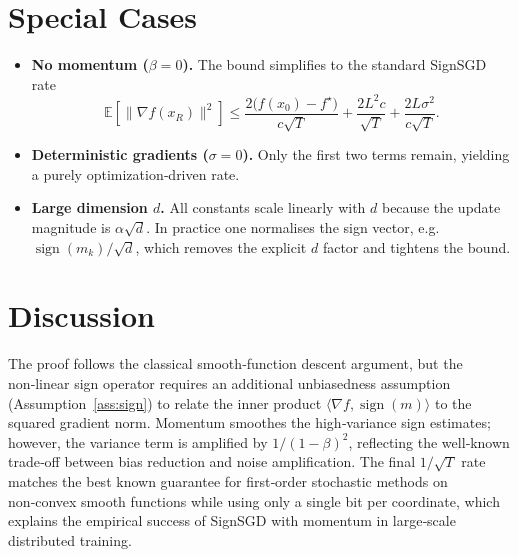 \documentclass{article}
\newcommand{\E}{\mathbb{E}}
\newcommand{\sgn}{\operatorname{sign}}
\begin{document}
\section*{Special Cases}
\begin{itemize}
\item \textbf{No momentum ($\beta=0$).}
The bound simplifies to the standard SignSGD rate
\[
\E[\|\nabla f(x_{R})\|^{2}]
\le
\frac{2\bigl(f(x_{0})-f^{\star}\bigr)}{c\sqrt{T}}
   +\frac{2L^{2}c}{\sqrt{T}}
   +\frac{2L\sigma^{2}}{c\sqrt{T}} .
\]
\item \textbf{Deterministic gradients ($\sigma=0$).}
Only the first two terms remain, yielding a purely
optimization‑driven rate.
\item \textbf{Large dimension $d$.}
All constants scale linearly with $d$ because the update magnitude is
$\alpha\sqrt{d}$.  In practice one normalises the sign vector,
e.g. $\sgn(m_{k})/\sqrt{d}$, which removes the explicit $d$ factor and
tightens the bound.
\end{itemize}

\section*{Discussion}
The proof follows the classical smooth‑function descent argument, but the
non‑linear sign operator requires an additional unbiasedness assumption
(Assumption~\ref{ass:sign}) to relate the inner product
$\langle\nabla f,\sgn(m)\rangle$ to the squared gradient norm.
Momentum smoothes the high‑variance sign estimates; however,
the variance term is amplified by $1/(1-\beta)^{2}$, reflecting the
well‑known trade‑off between bias reduction and noise amplification.
The final $1/\sqrt{T}$ rate matches the best known guarantee for
first‑order stochastic methods on non‑convex smooth functions while
using only a single bit per coordinate, which explains the empirical
success of SignSGD with momentum in large‑scale distributed training.
\end{document}
